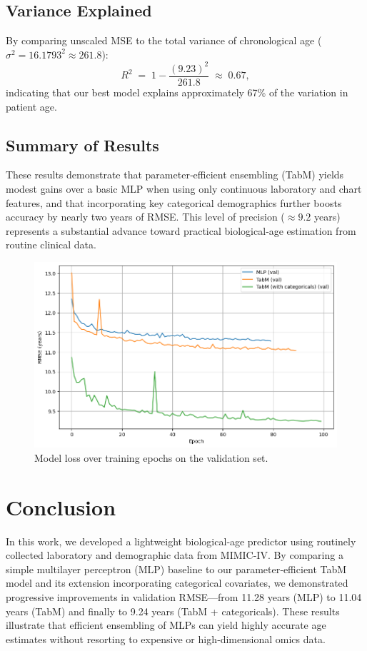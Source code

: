\documentclass[manuscript,screen,review]{acmart}
\begin{document}
\subsection{Variance Explained}

By comparing unscaled MSE to the total variance of chronological age ($\sigma^2 = 16.1793^2 \approx 261.8$):
\[
  R^2 \;=\; 1 - \frac{(9.23)^2}{261.8} \;\approx\; 0.67,
\]
indicating that our best model explains approximately 67\% of the variation in patient age.

\subsection{Summary of Results}

These results demonstrate that parameter‐efficient ensembling (TabM) yields modest gains over a basic MLP when using only continuous laboratory and chart features, and that incorporating key categorical demographics further boosts accuracy by nearly two years of RMSE. This level of precision ($\approx9.2$ years) represents a substantial advance toward practical biological‐age estimation from routine clinical data.

\begin{figure}[ht]
\centering
\includegraphics[width=\linewidth]{hrp.png}
\caption{Model loss over training epochs on the validation set.}
\label{fig:workflow}
\end{figure}


\section{Conclusion}

In this work, we developed a lightweight biological‐age predictor using routinely collected laboratory and demographic data from MIMIC-IV. By comparing a simple multilayer perceptron (MLP) baseline to our parameter‐efficient TabM model and its extension incorporating categorical covariates, we demonstrated progressive improvements in validation RMSE—from 11.28 years (MLP) to 11.04 years (TabM) and finally to 9.24 years (TabM + categoricals). These results illustrate that efficient ensembling of MLPs can yield highly accurate age estimates without resorting to expensive or high‐dimensional omics data.
\end{document}
